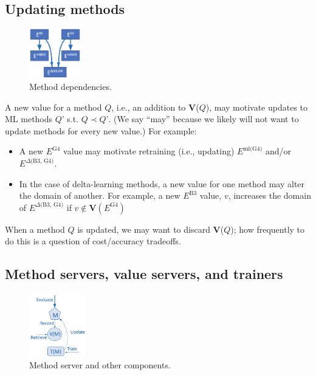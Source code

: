 \documentclass[10pt]{article}
\begin{document}
\subsection{Updating methods}

\begin{figure}
\vspace{-3ex}
  \centering
  \includegraphics[width=0.2\textwidth,trim=0in 0in 0in 0in,clip]{./Figs/deps.png}
  \vspace{-4ex}
  \caption{Method dependencies.
\label{fig:deps}}
\end{figure}

A new value for a method $Q$, i.e., an addition to \textbf{V}($Q$), may motivate updates to ML methods $Q’$ s.t. $Q \prec Q’$. 
(We say ``may'' because we likely will not want to update methods for every new value.)
For example:
\begin{itemize}\itemsep-0.2em 
\item
A new $E^{\textrm{G4}}$ value may motivate retraining (i.e., updating) $E^{\textrm{ml(G4)}}$ and/or $E^{\textrm{$\Delta$(B3, G4)}}$.
\item
In the case of delta-learning methods, a new value for one method may alter the domain of another.
For example, a new $E^{\textrm{B3}}$  value, $v$, increases the domain of $E^{\textrm{$\Delta$(B3, G4)}}$ if $v \notin \textbf{V}(E^{\textrm{G4}})$
\end{itemize}

When a method $Q$ is updated, we may want to discard \textbf{V}($Q$);
how frequently to do this is a question of cost/accuracy tradeoffs.

\subsection{Method servers, value servers, and trainers}

\begin{figure}
\vspace{-2ex}
  \centering
  \includegraphics[width=0.22\textwidth,trim=0in 0in 0in 0in,clip]{./Figs/servers.png}
  \vspace{-4ex}
  \caption{Method server and other components.
\label{fig:server}}
\end{figure}
\end{document}
